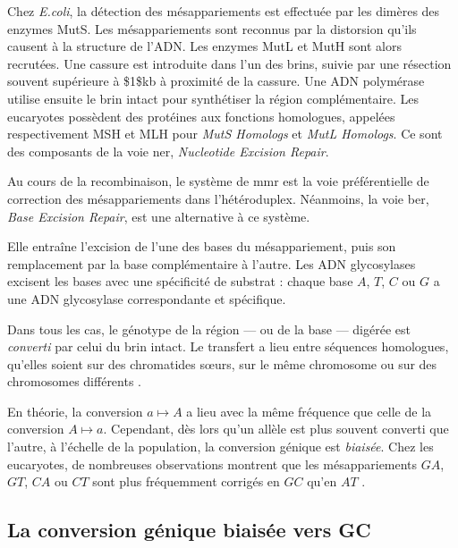 \documentclass[11pt, oneside]{scrartcl}
\begin{document}
Chez \emph{E.coli}, la détection des mésappariements est effectuée par les dimères
des enzymes MutS. Les mésappariements sont reconnus par la distorsion qu'ils
causent à la structure de l'ADN. Les enzymes MutL et MutH sont alors recrutées.
Une cassure est introduite dans l'un des brins, suivie par une résection souvent
supérieure à \$1\$kb à proximité de la cassure. Une ADN polymérase utilise ensuite
le brin intact pour synthétiser la région complémentaire. Les eucaryotes
possèdent des protéines aux fonctions homologues, appelées respectivement MSH et
MLH pour \emph{MutS Homologs} et \emph{MutL Homologs}. Ce sont des composants de la voie
\ac{ner}, \emph{Nucleotide Excision Repair}.

Au cours de la recombinaison, le système de \ac{mmr} est la voie préférentielle
de correction des mésappariements dans l'hétéroduplex. Néanmoins, la voie
\ac{ber}, \emph{Base Excision Repair}, est une alternative à ce système.

Elle entraîne l'excision de l'une des bases du mésappariement, puis son
remplacement par la base complémentaire à l'autre. Les ADN glycosylases excisent
les bases avec une spécificité de substrat : chaque base \(A\), \(T\), \(C\) ou \(G\) a
une ADN glycosylase correspondante et spécifique.

Dans tous les cas, le génotype de la région --- ou de la base --- digérée est
\emph{converti} par celui du brin intact. Le transfert a lieu entre séquences
homologues, qu'elles soient sur des chromatides sœurs, sur le même chromosome ou
sur des chromosomes différents \cite{chen_gene_2007}.

\begin{transition}

En théorie, la conversion $a \mapsto A$ a lieu avec la même fréquence que celle
de la conversion $A \mapsto a$. Cependant, dès lors qu'un allèle est plus
souvent converti que l'autre, à l'échelle de la population, la conversion
génique est {\em biaisée}. Chez les eucaryotes, de nombreuses observations montrent
que les mésappariements $GA$, $GT$, $CA$ ou $CT$ sont plus fréquemment corrigés
en $GC$ qu'en $AT$ \cite{duret_biased_2009}. 

\end{transition}

\subsection{La conversion génique biaisée vers GC}
\label{sec:orgheadline7}
\end{document}
